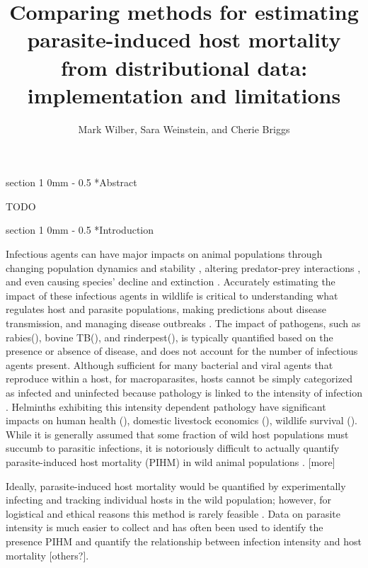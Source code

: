 \documentclass[12pt, a4paper]{article}
\title{Comparing methods for estimating parasite-induced host mortality from distributional data: implementation and limitations}
\author{Mark Wilber, Sara Weinstein, and Cherie Briggs}
\makeatletter
\renewcommand{\section}{\@startsection
{section}%
{1}%
{0mm}%
{-\baselineskip}%
{0.5\baselineskip}%
{\normalfont\bf\large}} %
\makeatother
\begin{document}
\maketitle

\section*{Abstract}

TODO

\doublespacing

\linenumbers
\section*{Introduction}

Infectious agents can have major impacts on animal populations through changing
population dynamics and stability \citep{Dobson1992}, altering predator-prey interactions \citep{Joly2004}, and
even causing species' decline and extinction \citep{DeCastro2005a,McCallum2012b}. Accurately estimating the impact
of these infectious agents in wildlife is critical to understanding what
regulates host and parasite populations, making predictions about disease
transmission, and managing disease outbreaks \citep{Langwig2015}. The impact of pathogens, such as rabies(), bovine TB(), and
rinderpest(),  is typically quantified based on the presence or absence of
disease, and does not account for the number of infectious agents present.
Although sufficient for many bacterial and viral agents that reproduce within a
host, for macroparasites, hosts cannot be simply categorized as infected and
uninfected because pathology is linked to the intensity of infection \citep{AndersonandMay1979}.  Helminths exhibiting this intensity dependent pathology have
significant impacts on human health (), domestic livestock economics (),
wildlife survival ().  While it is generally assumed that some fraction of
wild host populations must succumb to parasitic infections, it is notoriously
difficult to actually quantify parasite-induced host mortality (PIHM) in wild
animal populations \citep{Lafferty2002, McCallum2000a}. [more]

Ideally, parasite-induced host mortality would be
quantified by experimentally infecting and tracking individual hosts in the
wild population; however, for logistical and ethical reasons this method is
rarely feasible \citep{McCallum2000a}. Data on parasite intensity is much easier to collect and has
often been used to identify the presence PIHM \citep{Crofton1971a,Lester1977,Lester1984,Lanciani1989,Royce1990,Ferguson2011} and quantify the
relationship between infection intensity and host mortality \citep{Adjei1986} [others?].
\end{document}
